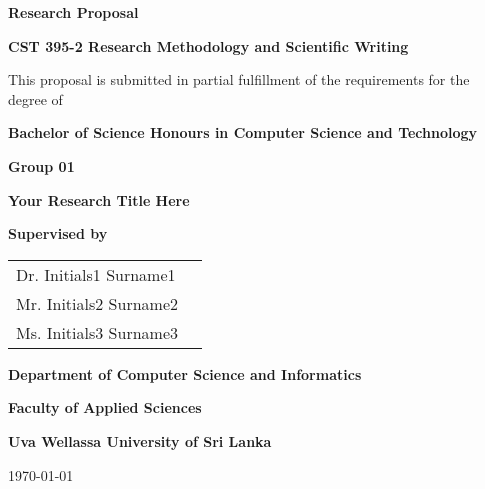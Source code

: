 \begin{titlepage}
	\centering
	\vspace*{1cm}
	
	\textbf{\LARGE Research Proposal}
	
	\vspace{0.5cm}
	\textbf{\large CST 395-2 Research Methodology and Scientific Writing}
	
	\vspace{1.5cm}
	\large This proposal is submitted in partial fulfillment of the requirements for the degree of 
	
	\textbf{\large Bachelor of Science Honours in Computer Science and Technology}
	
	
	\vspace{1cm}
	
	\textbf{\large Group 01}
	
	\vspace{0.3cm}
	\textbf{\Large Your Research Title Here}
	
	\vspace{1cm}
	
	\textbf{\large Supervised by}
	
	\vspace{0.5cm}
	\begin{tabular}{ll}
		Dr. Initials1 Surname1 \\
		Mr. Initials2 Surname2 \\
		Ms. Initials3 Surname3 \\
	\end{tabular}
	
	\vfill
	
	\textbf{\large Department of Computer Science and Informatics}
	
	\textbf{\large Faculty of Applied Sciences}
	
	\textbf{\large Uva Wellassa University of Sri Lanka}
	
	\vspace{1cm}
	
	\large\today
	
\end{titlepage}